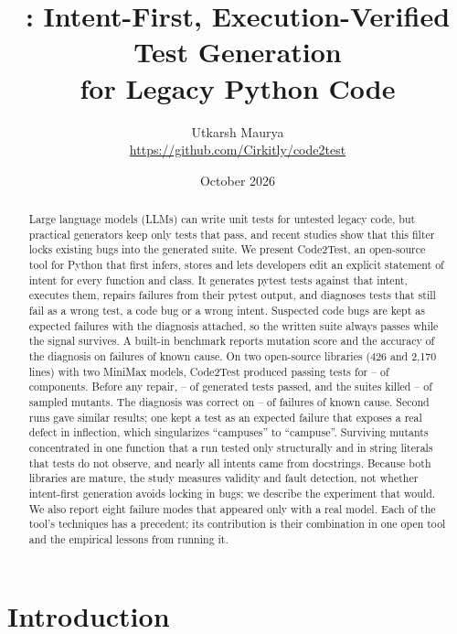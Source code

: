 \documentclass[11pt]{article}
\title{\toolname: Intent-First, Execution-Verified Test Generation\\for Legacy Python Code}
\author{Utkarsh Maurya\\
\small\url{https://github.com/Cirkitly/code2test}}
\date{October 2026}
\newcommand{\toolname}{Code2Test}
\begin{document}
\maketitle

\begin{abstract}
Large language models (LLMs) can write unit tests for untested legacy code, but practical generators keep only tests that pass, and recent studies show that this filter locks existing bugs into the generated suite.
We present \toolname{}, an open-source tool for Python that first infers, stores and lets developers edit an explicit statement of intent for every function and class.
It generates pytest tests against that intent, executes them, repairs failures from their pytest output, and diagnoses tests that still fail as a wrong test, a code bug or a wrong intent.
Suspected code bugs are kept as expected failures with the diagnosis attached, so the written suite always passes while the signal survives.
A built-in benchmark reports mutation score and the accuracy of the diagnosis on failures of known cause.
On two open-source libraries (426 and 2{,}170 lines) with two MiniMax models, \toolname{} produced passing tests for \MinAcceptance--\MaxAcceptance{} of components.
Before any repair, \MinFirstRate--\MaxFirstRate{} of generated tests passed, and the suites killed \MinMutationScore--\MaxMutationScore{} of sampled mutants.
The diagnosis was correct on \MinDiagAccuracy--\MaxDiagAccuracy{} of failures of known cause.
Second runs gave similar results; one kept a test as an expected failure that exposes a real defect in inflection, which singularizes ``campuses'' to ``campuse''.
Surviving mutants concentrated in one function that a run tested only structurally and in string literals that tests do not observe, and nearly all intents came from docstrings.
Because both libraries are mature, the study measures validity and fault detection, not whether intent-first generation avoids locking in bugs; we describe the experiment that would.
We also report eight failure modes that appeared only with a real model.
Each of the tool's techniques has a precedent; its contribution is their combination in one open tool and the empirical lessons from running it.
\end{abstract}

\section{Introduction}
\end{document}
